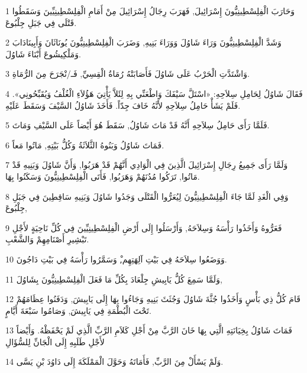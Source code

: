 \par 1 وَحَارَبَ الْفِلِسْطِينِيُّونَ إِسْرَائِيلَ, فَهَرَبَ رِجَالُ إِسْرَائِيلَ مِنْ أَمَامِ الْفِلِسْطِينِيِّينَ وَسَقَطُوا قَتْلَى فِي جَبَلِ جِلْبُوعَ.
\par 2 وَشَدَّ الْفِلِسْطِينِيُّونَ وَرَاءَ شَاوُلَ وَوَرَاءَ بَنِيهِ, وَضَرَبَ الْفِلِسْطِينِيُّونَ يُونَاثَانَ وَأَبِينَادَابَ وَمَلْكِيشُوعَ أَبْنَاءَ شَاوُلَ.
\par 3 وَاشْتَدَّتِ الْحَرْبُ عَلَى شَاوُلَ فَأَصَابَتْهُ رُمَاةُ الْقِسِيِّ, فَـ/نْجَرَحَ مِنَ الرُّمَاةِ.
\par 4 فَقَالَ شَاوُلُ لِحَامِلِ سِلاَحِهِ: «اسْتَلَّ سَيْفَكَ وَاطْعَنِّي بِهِ لِئَلاَّ يَأْتِيَ هَؤُلاَءِ الْغُلْفُ وَيُقَبِّحُونِي». فَلَمْ يَشَأْ حَامِلُ سِلاَحِهِ لأَنَّهُ خَافَ جِدّاً. فَأَخَذَ شَاوُلُ السَّيْفَ وَسَقَطَ عَلَيْهِ.
\par 5 فَلَمَّا رَأَى حَامِلُ سِلاَحِهِ أَنَّهُ قَدْ مَاتَ شَاوُلُ, سَقَطَ هُوَ أَيْضاً عَلَى السَّيْفِ وَمَاتَ.
\par 6 فَمَاتَ شَاوُلُ وَبَنُوهُ الثَّلاَثَةُ وَكُلُّ بَيْتِهِ, مَاتُوا مَعاً.
\par 7 وَلَمَّا رَأَى جَمِيعُ رِجَالِ إِسْرَائِيلَ الَّذِينَ فِي الْوَادِي أَنَّهُمْ قَدْ هَرَبُوا, وَأَنَّ شَاوُلَ وَبَنِيهِ قَدْ مَاتُوا, تَرَكُوا مُدُنَهُمْ وَهَرَبُوا, فَأَتَى الْفِلِسْطِينِيُّونَ وَسَكَنُوا بِهَا.
\par 8 وَفِي الْغَدِ لَمَّا جَاءَ الْفِلِسْطِينِيُّونَ لِيُعَرُّوا الْقَتْلَى وَجَدُوا شَاوُلَ وَبَنِيهِ سَاقِطِينَ فِي جَبَلِ جِلْبُوعَ,
\par 9 فَعَرُّوهُ وَأَخَذُوا رَأْسَهُ وَسِلاَحَهُ, وَأَرْسَلُوا إِلَى أَرْضِ الْفِلِسْطِينِيِّينَ فِي كُلِّ نَاحِيَةٍ لأَجْلِ تَبْشِيرِ أَصْنَامِهِمْ وَالشَّعْبِ.
\par 10 وَوَضَعُوا سِلاَحَهُ فِي بَيْتِ آلِهَتِهِم,ْ وَسَمَّرُوا رَأْسَهُ فِي بَيْتِ دَاجُونَ.
\par 11 وَلَمَّا سَمِعَ كُلُّ يَابِيشِ جِلْعَادَ بِكُلِّ مَا فَعَلَ الْفِلِسْطِينِيُّونَ بِشَاوُلَ,
\par 12 قَامَ كُلُّ ذِي بَأْسٍ وَأَخَذُوا جُثَّةَ شَاوُلَ وَجُثَثَ بَنِيهِ وَجَاءُوا بِهَا إِلَى يَابِيشَ, وَدَفَنُوا عِظَامَهُمْ تَحْتَ الْبُطْمَةِ فِي يَابِيشَ, وَصَامُوا سَبْعَةَ أَيَّامٍ.
\par 13 فَمَاتَ شَاوُلُ بِخِيَانَتِهِ الَّتِي بِهَا خَانَ الرَّبَّ مِنْ أَجْلِ كَلاَمِ الرَّبِّ الَّذِي لَمْ يَحْفَظْهُ. وَأَيْضاً لأَجْلِ طَلَبِهِ إِلَى الْجَانِّ لِلسُّؤَالِ
\par 14 وَلَمْ يَسْأَلْ مِنَ الرَّبِّ, فَأَمَاتَهُ وَحَوَّلَ الْمَمْلَكَةَ إِلَى دَاوُدَ بْنِ يَسَّى.

